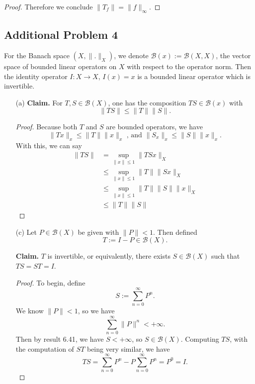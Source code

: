 \documentclass[12pt]{article}
\newcommand{\eq}[1]{\begin{equation*}#1\end{equation*}}
\newcommand{\al}[1]{\begin{align*}#1\end{align*}}
\begin{document}
\begin{itemize}
\begin{proof}
            Therefore we conclude $\|T_f\| = \|f\|_\infty$.
    \end{proof}
\end{itemize}

\subsection*{Additional Problem 4}

For the Banach space $(X, \|.\|_X)$, we denote $\mathcal{B}(x) := \mathcal{B}(X, X)$, the vector space of bounded linear operators on $X$ with respect to the operator norm. Then the identity operator $I : X \to X$, $I(x) = x$ is a bounded linear operator which is invertible.

\begin{itemize}
    \item [(a)] \textbf{Claim. } For $T, S \in \mathcal{B}(X)$, one has the composition $TS \in \mathcal{B}(x)$ with 
    \eq{\|TS\| \leq \|T\| \|S\|.}

    \begin{proof}
        Because both $T$ and $S$ are bounded operators, we have 
        \eq{\|Tx\|_x \leq \|T\| \|x\|_x \text{ , and } \|S_x\|_x \leq \|S\| \|x\|_x.}
        With this, we can say
        \al{\|TS\| &= \sup_{\|x\| \leq 1} \|TSx\|_X \\
                   &\leq \sup_{\|x\| \leq 1} \|T\| \|Sx\|_X \\
                   &\leq \sup_{\|x\| \leq 1} \|T\| \|S\| \|x\|_X \\
                   &\leq \|T\|\|S\|}
    \end{proof}
    \item [(c)] Let $P \in \mathcal{B}(X)$ be given with $\|P\| < 1$. Then defined
    \eq{T := I - P \in \mathcal{B}(X).}

    \textbf{Claim. } $T$ is invertible, or equivalently, there exists $S \in \mathcal{B}(X)$ such that $TS = ST = I$.

    \begin{proof}
        To begin, define 
        \eq{S := \sum_{n=0}^{\infty} P^n.}
        We know $\|P\| < 1$, so we have
        \eq{\sum_{n=0}^{\infty} \|P\|^n < +\infty.}
        Then by result 6.41, we have $S < +\infty$, so $S \in \mathcal{B}(X)$. Computing $TS$, with the computation of $ST$ being very similar, we have
        \eq{TS = \sum_{n=0}^{\infty} P^n - P \sum_{n=0}^{\infty} P^n = P^0 = I.}
    \end{proof}
\end{itemize}
\end{document}
